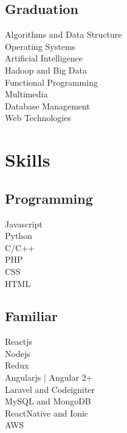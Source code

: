 \documentclass[]{deedy-resume-openfont}
\begin{document}
\begin{minipage}[t]{0.33\textwidth}
\subsection{Graduation}
Algorithms and Data Structure \\
Operating Systems \\
Artificial Intelligence \\
Hadoop and Big Data \\
Functional Programming \\
Multimedia \\
Database Management \\
Web Technologies
\sectionsep

\section{Skills}
\subsection{Programming}
\textbullet{} Javascript \\
\textbullet{} Python \\
\textbullet{} C/C++ \\
\textbullet{} PHP \\
\textbullet{} CSS \\
\textbullet{} HTML \\
\sectionsep
\subsection{Familiar}
 \textbullet{} Reactjs \\
 \textbullet{} Nodejs \\
 \textbullet{} Redux \\
 \textbullet{} Angularjs | Angular 2+ \\
 \textbullet{} Laravel and Codeigniter \\
 \textbullet{} MySQL and MongoDB \\
 \textbullet{} ReactNative and Ionic \\
 \textbullet{} AWS \\
\sectionsep

%
%

\end{minipage} 
\hfill
\end{document}
